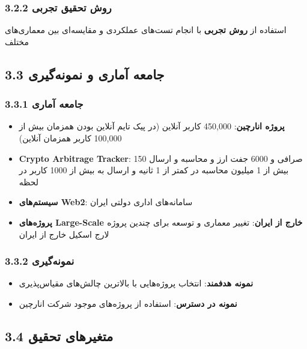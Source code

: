 \documentclass[
]{article}
\providecommand{\tightlist}{%
  \setlength{\itemsep}{0pt}\setlength{\parskip}{0pt}}
\begin{document}
\subsubsection{3.2.2 روش تحقیق
تجربی}\label{ux631ux648ux634-ux62aux62dux642ux6ccux642-ux62aux62cux631ux628ux6cc}

استفاده از \textbf{روش تجربی} با انجام تست‌های عملکردی و مقایسه‌ای بین
معماری‌های مختلف

\subsection{3.3 جامعه آماری و
نمونه‌گیری}\label{ux62cux627ux645ux639ux647-ux622ux645ux627ux631ux6cc-ux648-ux646ux645ux648ux646ux647ux6afux6ccux631ux6cc}

\subsubsection{3.3.1 جامعه
آماری}\label{ux62cux627ux645ux639ux647-ux622ux645ux627ux631ux6cc}

\begin{itemize}
\tightlist
\item
  \textbf{پروژه انارچین}: 450,000 کاربر آنلاین (در پیک تایم آنلاین بودن
  همزمان بیش از 100,000 کاربر همزمان آنلاین)
\item
  \textbf{Crypto Arbitrage Tracker}: 150 صرافی و 6000 جفت ارز و محاسبه و
  ارسال بیش از 1 میلیون محاسبه در کمتر از 1 ثانیه و ارسال به بیش از 1000
  کاربر در لحظه
\item
  \textbf{سیستم‌های Web2}: سامانه‌های اداری دولتی ایران
\item
  \textbf{پروژه‌های Large-Scale خارج از ایران}: تغییر معماری و توسعه برای
  چندین پروژه لارج اسکیل خارج از ایران
\end{itemize}

\subsubsection{3.3.2
نمونه‌گیری}\label{ux646ux645ux648ux646ux647ux6afux6ccux631ux6cc}

\begin{itemize}
\tightlist
\item
  \textbf{نمونه هدفمند}: انتخاب پروژه‌هایی با بالاترین چالش‌های مقیاس‌پذیری
\item
  \textbf{نمونه در دسترس}: استفاده از پروژه‌های موجود شرکت انارچین
\end{itemize}

\subsection{3.4 متغیرهای
تحقیق}\label{ux645ux62aux63aux6ccux631ux647ux627ux6cc-ux62aux62dux642ux6ccux642}
\end{document}
